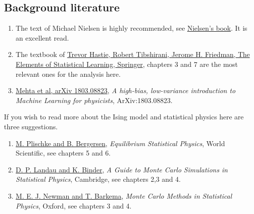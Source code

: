 \documentclass[%
oneside,                 %
final,                   %
10pt]{article}
\begin{document}
\subsection*{Background literature}

\begin{enumerate}
\item The text of Michael Nielsen is highly recommended, see \href{{http://neuralnetworksanddeeplearning.com/}}{Nielsen's book}. It is an excellent read.

\item The textbook of \href{{https://www.springer.com/gp/book/9780387848570}}{Trevor Hastie, Robert Tibshirani, Jerome H. Friedman, The Elements of Statistical Learning, Springer}, chapters 3 and 7 are the most relevant ones for the analysis here. 

\item \href{{https://arxiv.org/abs/1803.08823}}{Mehta et al, arXiv 1803.08823}, \emph{A high-bias, low-variance introduction to Machine Learning for physicists}, ArXiv:1803.08823.
\end{enumerate}

\noindent
If you wish to read more about the Ising model and statistical physics here are three suggestions.

\begin{enumerate}
\item \href{{http://www.worldscientific.com/worldscibooks/10.1142/5660}}{M. Plischke and B. Bergersen}, \emph{Equilibrium Statistical Physics}, World Scientific, see chapters 5 and 6.

\item \href{{http://www.cambridge.org/no/academic/subjects/physics/computational-science-and-modelling/guide-monte-carlo-simulations-statistical-physics-4th-edition?format=HB}}{D. P. Landau and K. Binder}, \emph{A Guide to Monte Carlo Simulations in Statistical Physics}, Cambridge, see chapters 2,3 and 4.

\item \href{{https://global.oup.com/academic/product/monte-carlo-methods-in-statistical-physics-9780198517979?cc=no&lang=en&}}{M. E. J. Newman and T. Barkema}, \emph{Monte Carlo Methods in Statistical Physics}, Oxford, see chapters 3 and 4.
\end{enumerate}

\noindent

\end{document}
